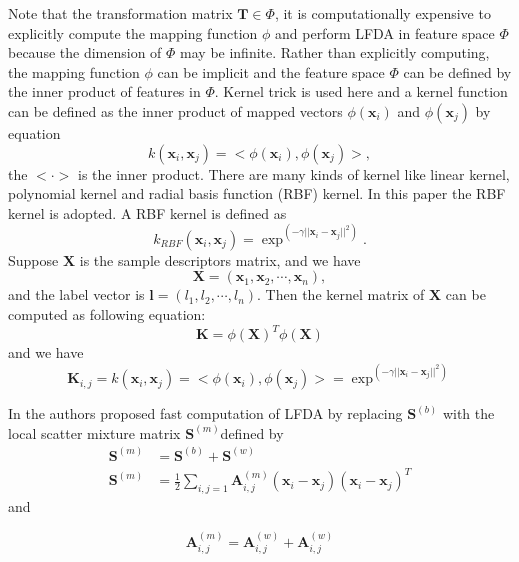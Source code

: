Note that the transformation matrix $\bm{T} \in \Phi$, it is computationally expensive to explicitly compute the mapping function $\phi$ and perform LFDA in feature space $\Phi$ because the dimension of $\Phi$ may be infinite. Rather than explicitly computing, the mapping function $\phi$ can be implicit and the feature space $\Phi$ can be defined by the inner product of features in $\Phi$. Kernel trick is used here and a kernel function can be defined as the inner product of mapped vectors $\phi(\bm{x}_i)$ and $\phi(\bm{x}_j)$ by equation
 \begin{equation}
 k(\bm{x}_i,\bm{x}_j) = <\phi(\bm{x}_i),\phi(\bm{x}_j)>,
 \end{equation}
 the $< \cdot >$ is the inner product. There are many kinds of kernel like linear kernel, polynomial kernel and radial basis function (RBF) kernel. In this paper the RBF kernel is adopted. A RBF kernel is defined as 
 \begin{equation}
 k_{RBF}(\bm{x}_i,\bm{x}_j) = \exp^{(-\gamma||\bm{x}_i-\bm{x}_j||^2)}. 
 \end{equation}
Suppose $\bm{X}$ is the sample descriptors matrix, and we have
\begin{equation}
\bm{X} = (\bm{x}_1, \bm{x}_2,\cdots, \bm{x}_n), 
\end{equation}
and the label vector is $\bm{l} = (l_1, l_2, \cdots, l_n)$. Then the kernel matrix of $\bm{X}$ can be computed as following equation:
\begin{equation}
\bm{K} =  \phi(\bm{X})^T \phi(\bm{X})
\end{equation}
and we have 
\begin{equation}
\bm{K}_{i,j} =  k(\bm{x}_i,\bm{x}_j) = <\phi(\bm{x}_i),\phi(\bm{x}_j)> =  \exp^{(-\gamma||\bm{x}_i-\bm{x}_j||^2)}
\end{equation}

In \cite{KLFDA} the authors proposed fast computation of LFDA by replacing $\bm{S}^{(b)}$ with the local scatter mixture matrix $\bm{S}^{(m)}$defined by 
\begin{equation}
\begin{aligned}
\bm{S}^{(m)} &= \bm{S}^{(b)} + \bm{S}^{(w)}\\
\bm{S}^{(m)} &= \frac{1}{2} \sum_{i,j = 1} \bm{A}_{i,j}^{(m)} (\bm{x}_i - \bm{x}_j)(\bm{x}_i - \bm{x}_j)^T
\end{aligned}
\end{equation}
and 

\begin{equation}
\bm{A}_{i,j}^{(m)} = \bm{A}_{i,j}^{(w)}  + \bm{A}_{i,j}^{(w)}
\end{equation}

